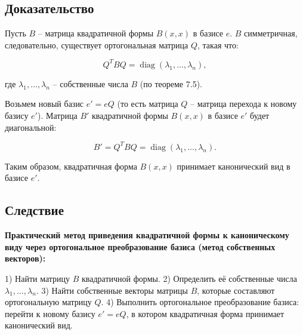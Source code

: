 {\subsection*{Доказательство}

Пусть \( B \) – матрица квадратичной формы \( B(x, x) \) в базисе \( e \). \( B \) симметричная, следовательно, существует ортогональная матрица \( Q \), такая что:



\[
Q^T B Q = \operatorname{diag} (\lambda_1, \ldots, \lambda_n),
\]



где \( \lambda_1, \ldots, \lambda_n \) – собственные числа \( B \) (по теореме 7.5).

Возьмем новый базис \( e' = e Q \) (то есть матрица \( Q \) – матрица перехода к новому базису \( e' \)). Матрица \( B' \) квадратичной формы \( B(x, x) \) в базисе \( e' \) будет диагональной:



\[
B' = Q^T B Q = \operatorname{diag} (\lambda_1, \ldots, \lambda_n).
\]



Таким образом, квадратичная форма \( B(x, x) \) принимает канонический вид в базисе \( e' \).

\subsection*{Следствие}

\textbf{Практический метод приведения квадратичной формы к каноническому виду через ортогональное преобразование базиса (метод собственных векторов):}

1) Найти матрицу \( B \) квадратичной формы.
2) Определить её собственные числа \( \lambda_1, \dots, \lambda_n \).
3) Найти собственные векторы матрицы \( B \), которые составляют ортогональную матрицу \( Q \).
4) Выполнить ортогональное преобразование базиса: перейти к новому базису \( e' = e Q \), в котором квадратичная форма принимает канонический вид.


}